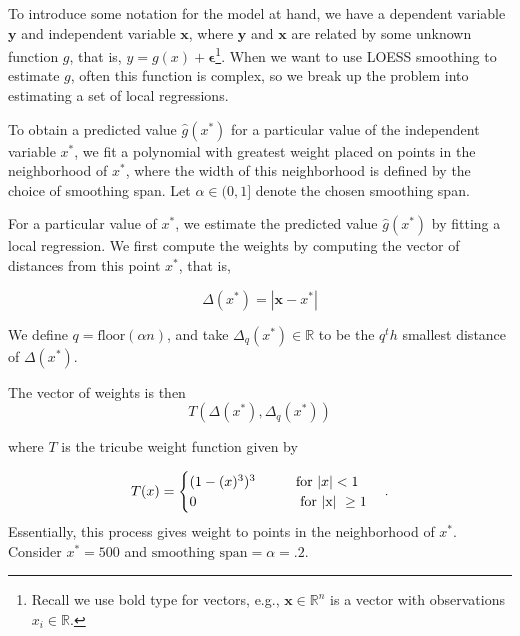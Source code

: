 \documentclass[12pt,twoside]{smiththesis}
\begin{document}
To introduce some notation for the model at hand, we have a dependent variable \(\mathbf y\) and independent variable \(\mathbf x\), where \(\mathbf y\) and \(\mathbf x\) are related by some unknown function \(g\), that is, \(y = g(x) + \boldsymbol \epsilon\)\footnote{Recall we use bold type for vectors, e.g., \(\mathbf x \in \mathbb R^n\) is a vector with observations \(x_i \in \mathbb R\).}. When we want to use LOESS smoothing to estimate \(g\), often this function is complex, so we break up the problem into estimating a set of local regressions.

To obtain a predicted value \(\hat g(x^*)\) for a particular value of the independent variable \(x^*\), we fit a polynomial with greatest weight placed on points in the neighborhood of \(x^*\), where the width of this neighborhood is defined by the choice of smoothing span. Let \(\alpha \in (0,1]\) denote the chosen smoothing span.

For a particular value of \(x^*\), we estimate the predicted value \(\hat g(x^*)\) by fitting a local regression. We first compute the weights by computing the vector of distances from this point \(x^*\), that is,

\[\Delta (x^*) = |\mathbf x -x^* | \]

We define \(q = \text{floor}(\alpha n)\), and take \(\Delta_q(x^*) \in \mathbb R\) to be the \(q^th\) smallest distance of \(\Delta (x^*)\).

The vector of weights is then
\[T(\Delta(x^*), \Delta_q(x^*))\]

where \(T\) is the tricube weight function given by

\[
T(x) = \begin{cases} (1-(x)^3)^3 \hspace{9 mm}  \text{ for } |x| < 1\\
0  \hspace{25 mm} \text{ for |x| } \geq 1 \end{cases}.
\]
Essentially, this process gives weight to points in the neighborhood of \(x^*\). Consider \(x^* = 500\) and \(\text{smoothing span} = \alpha = .2\).
\end{document}
